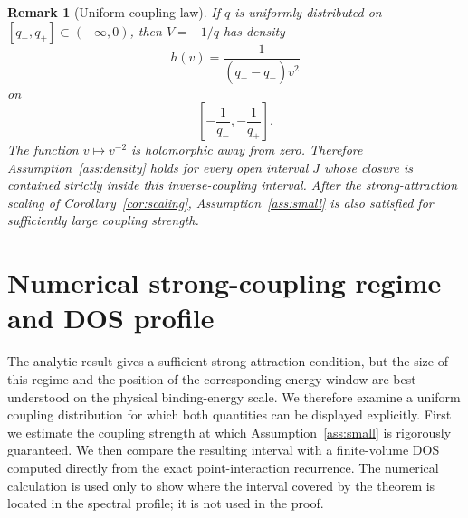 \documentclass[12pt,a4paper]{article}
\numberwithin{equation}{section}
\newtheorem{rem}[thm]{Remark}
\begin{document}
\begin{rem}[Uniform coupling law]\label{rem:uniform-coupling}
If $q$ is uniformly distributed on $[q_-,q_+]\subset(-\infty,0)$, then
$V=-1/q$ has density
$$
h(v)=\frac{1}{(q_+-q_-)v^2}
$$
on
$$
\left[-\frac{1}{q_-},-\frac{1}{q_+}\right].
$$
The function $v\mapsto v^{-2}$ is holomorphic away from zero.  Therefore
Assumption~\ref{ass:density} holds for every open interval $J$ whose closure
is contained strictly inside this inverse-coupling interval.  After the strong-attraction
scaling of Corollary~\ref{cor:scaling}, Assumption~\ref{ass:small} is also
satisfied for sufficiently large coupling strength.
\end{rem}


\section{Numerical strong-coupling regime and DOS profile}\label{sec:numerics}

The analytic result gives a sufficient strong-attraction condition, but the
size of this regime and the position of the corresponding energy window are
best understood on the physical binding-energy scale.  We therefore examine a
uniform coupling distribution for which both quantities can be displayed
explicitly.  First we estimate the coupling strength at which
Assumption~\ref{ass:small} is rigorously guaranteed.  We then compare the
resulting interval with a finite-volume DOS computed directly from the exact
point-interaction recurrence.  The numerical calculation is used only to show
where the interval covered by the theorem is located in the spectral profile; it is
not used in the proof.
\end{document}
